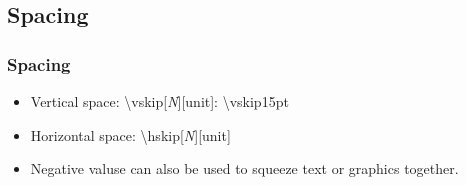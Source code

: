 \documentclass[11pt,pdf,aspectratio=43]{beamer}
\begin{document}
\subsection*{Spacing}
\begin{frame}
    \frametitle{Spacing}
    \begin{itemize}
	\item	Vertical space:	\textbackslash{vskip}[\emph{N}][unit]:	\textbackslash{vskip15pt}
	\item	Horizontal space: \textbackslash{hskip}[\emph{N}][unit]
	\item	Negative valuse can also be used to squeeze text or graphics together.
    \end{itemize}
\end{frame}

\end{document}
